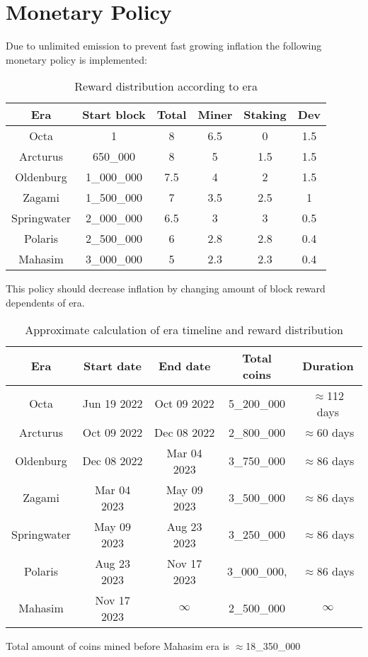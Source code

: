\section{Monetary Policy}
\label{sec:mp}

Due to unlimited emission to prevent fast growing inflation the following monetary policy is implemented:

\begin{table}[h!]
\centering
\begin{tabular}{||c c c c c c||}
    \hline
        Era & Start block & Total & Miner & Staking & Dev \\ [0.5ex]

        \hline\hline
        Octa & 1 & 8 & 6.5 & 0 & 1.5 \\
        Arcturus & 650\_000 & 8 & 5 & 1.5 & 1.5 \\
        Oldenburg & 1\_000\_000 & 7.5 & 4 & 2 & 1.5 \\
        Zagami & 1\_500\_000 & 7 & 3.5 & 2.5 & 1 \\
        Springwater & 2\_000\_000 & 6.5 & 3 & 3 & 0.5 \\
        Polaris & 2\_500\_000 & 6 & 2.8 & 2.8 & 0.4 \\
        Mahasim & 3\_000\_000 & 5 & 2.3 & 2.3 & 0.4 \\ [1ex]
    \hline

\end{tabular}
\caption{Reward distribution according to era}
\label{table:1}
\end{table}

This policy should decrease inflation by changing amount of block reward dependents of era.

\begin{table}[h!]
\centering
\begin{tabular}{||c c c c c||}
    \hline
        Era & Start date & End date & Total coins & Duration \\ [0.5ex]

        \hline\hline
        Octa & Jun 19 2022 & Oct 09 2022 & 5\_200\_000 & $\approx$112 days \\
        Arcturus & Oct 09 2022 & Dec 08 2022 & 2\_800\_000 & $\approx$60 days \\
        Oldenburg & Dec 08 2022 & Mar 04 2023 & 3\_750\_000 & $\approx$86 days \\
        Zagami & Mar 04 2023 & May 09 2023 &  3\_500\_000 & $\approx$86 days \\
        Springwater & May 09 2023 & Aug 23 2023 & 3\_250\_000 & $\approx$86 days \\
        Polaris & Aug 23 2023& Nov 17 2023 & 3\_000\_000, & $\approx$86 days \\
        Mahasim & Nov 17 2023 & $\infty$ & 2\_500\_000 & $\infty$ \\ [1ex]
    \hline

\end{tabular}
\caption{Approximate calculation of era timeline and reward distribution}
\label{table:1}
\end{table}

Total amount of coins mined before Mahasim era is $\approx$18\_350\_000
